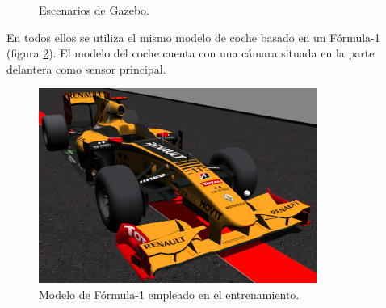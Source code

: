 \begin{figure}[ht!]
  \begin{center}
    \hspace{0.1cm}
    \hspace{0.1cm}
  \end{center}
  \centering
  \captionsetup{justification=centering,margin=2cm}
  \caption{Escenarios de Gazebo.}
  \label{fig:gazebo-circuitos}
\end{figure}


En todos ellos se utiliza el mismo modelo de coche basado en un Fórmula-1 (figura \ref{fig:f1-model}). El modelo del coche cuenta con una cámara situada en la parte delantera como sensor principal.

\begin{figure}[!ht]
    \centering \includegraphics[width=0.4\columnwidth]{./figures/chapter_4/model_f1.png}
    \caption{
        \label{fig:f1-model}
            Modelo de Fórmula-1 empleado en el entrenamiento.
    }
\end{figure}

